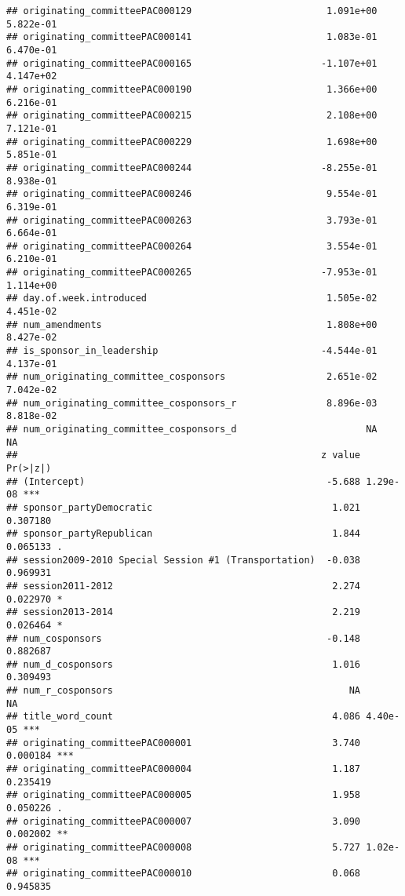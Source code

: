 \documentclass[]{article}
\begin{document}
\begin{verbatim}
## originating_committeePAC000129                        1.091e+00  5.822e-01
## originating_committeePAC000141                        1.083e-01  6.470e-01
## originating_committeePAC000165                       -1.107e+01  4.147e+02
## originating_committeePAC000190                        1.366e+00  6.216e-01
## originating_committeePAC000215                        2.108e+00  7.121e-01
## originating_committeePAC000229                        1.698e+00  5.851e-01
## originating_committeePAC000244                       -8.255e-01  8.938e-01
## originating_committeePAC000246                        9.554e-01  6.319e-01
## originating_committeePAC000263                        3.793e-01  6.664e-01
## originating_committeePAC000264                        3.554e-01  6.210e-01
## originating_committeePAC000265                       -7.953e-01  1.114e+00
## day.of.week.introduced                                1.505e-02  4.451e-02
## num_amendments                                        1.808e+00  8.427e-02
## is_sponsor_in_leadership                             -4.544e-01  4.137e-01
## num_originating_committee_cosponsors                  2.651e-02  7.042e-02
## num_originating_committee_cosponsors_r                8.896e-03  8.818e-02
## num_originating_committee_cosponsors_d                       NA         NA
##                                                      z value Pr(>|z|)    
## (Intercept)                                           -5.688 1.29e-08 ***
## sponsor_partyDemocratic                                1.021 0.307180    
## sponsor_partyRepublican                                1.844 0.065133 .  
## session2009-2010 Special Session #1 (Transportation)  -0.038 0.969931    
## session2011-2012                                       2.274 0.022970 *  
## session2013-2014                                       2.219 0.026464 *  
## num_cosponsors                                        -0.148 0.882687    
## num_d_cosponsors                                       1.016 0.309493    
## num_r_cosponsors                                          NA       NA    
## title_word_count                                       4.086 4.40e-05 ***
## originating_committeePAC000001                         3.740 0.000184 ***
## originating_committeePAC000004                         1.187 0.235419    
## originating_committeePAC000005                         1.958 0.050226 .  
## originating_committeePAC000007                         3.090 0.002002 ** 
## originating_committeePAC000008                         5.727 1.02e-08 ***
## originating_committeePAC000010                         0.068 0.945835    

\end{verbatim}
\end{document}
